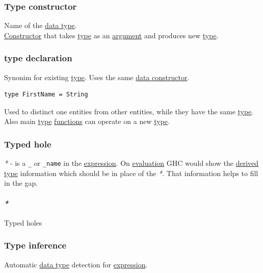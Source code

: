 \documentclass[11pt]{article}
\begin{document}
\subsubsection{\label{org385fa30}Type constructor}
\label{sec:orgceb5841}
Name of the \hyperref[org212d9c3]{data type}.\\

\hyperref[orgf4d811d]{Constructor} that takes \hyperref[orgc4aea2f]{type} as an \hyperref[orga6b7e97]{argument} and produces new \hyperref[orgc4aea2f]{type}.\\


\subsubsection{\label{orgaf25b40}type declaration}
\label{sec:orga410690}
Synonim for existing \hyperref[orgc4aea2f]{type}. Uses the same \hyperref[org1fbdcfd]{data constructor}.\\
\begin{verbatim}
type FirstName = String
\end{verbatim}
Used to distinct one entities from other entities, while they have the same \hyperref[orgc4aea2f]{type}.\\
Also main \hyperref[orgc4aea2f]{type} \hyperref[orgaa8fb87]{functions} can operate on a new \hyperref[orgc4aea2f]{type}.\\

\subsubsection{\label{org799c521}Typed hole}
\label{sec:org22d7b25}
\emph{*} - is a \texttt{\_} or \texttt{\_name} in the \hyperref[org9021dd7]{expression}. On \hyperref[orgbb765d1]{evaluation} GHC would show the \hyperref[org8c97145]{derived} \hyperref[orgc4aea2f]{type} information which should be in place of the \emph{*}. That information helps to fill in the gap.\\

\paragraph{\emph{*}}
\label{sec:org0044c69}

\label{org72b0d38}Typed holes\\

\subsubsection{\label{orgf93c945}Type inference}
\label{sec:orgdedfbbb}
Automatic \hyperref[org212d9c3]{data type} detection for \hyperref[org9021dd7]{expression}.\\
\end{document}
